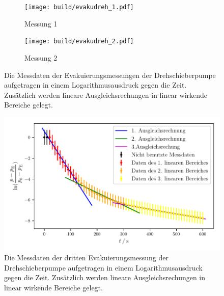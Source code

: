     \begin{figure}[h]
      \begin{subfigure}{0.48\textwidth}
        \centering
        \texttt{[image: build/evakudreh\_1.pdf]}
        \caption{Messung 1}
        \label{fig:dreh_eva_1}
      \end{subfigure}
      \hfill
      \begin{subfigure}{0.48\textwidth}
        \centering
        \texttt{[image: build/evakudreh\_2.pdf]}
        \caption{Messung 2}
        \label{fig:dreh_eva_2}
      \end{subfigure}
      \caption{Die Messdaten der Evakuierungsmessungen der Drehschieberpumpe aufgetragen in einem Logarithmusausdruck gegen die Zeit. 
      Zusätzlich werden lineare Ausgleichsrechungen in linear wirkende Bereiche gelegt.}
      \label{fig:dreh_eva_1_2}
    \end{figure}



    \begin{figure}[h]
      \centering
      \includegraphics[width=\textwidth]{build/evakudreh_3_small.pdf}
      \caption{Die Messdaten der dritten Evakuierungsmessung der Drehschieberpumpe aufgetragen in einem Logarithmusausdruck gegen die Zeit. Zusätzlich werden lineare Ausgleichsrechungen in linear wirkende Bereiche gelegt.}
      \label{fig:evaku_dreh_3}
    \end{figure}

